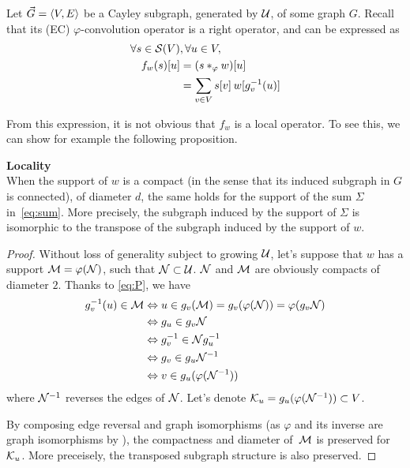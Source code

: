 Let $\vgve$ be a Cayley subgraph, generated by $\cu$, of some graph $G$. Recall that its (EC) $\varphi$-convolution operator is a right operator, and can be expressed as
\begin{align}
\forall s \in \cs(V) &, \forall u \in V,\nonumber\\
f_w(s)[u] & = (s \ast_{\varphi} w) [u]\nonumber\\
          & = \displaystyle\sum_{v \in V} s[v] \h{2} w[g_v^{-1}(u)] \label{eq:sum}
\end{align}

From this expression, it is not obvious that $f_w$ is a local operator. To see this, we can show for example the following proposition.

\begin{proposition}\textbf{Locality}\\
When the support of $w$ is a compact (in the sense that its induced subgraph in $G$ is connected), of diameter $d$, the same holds for the support of the sum $\Sigma$ in~\eqref{eq:sum}. More precisely, the subgraph induced by the support of $\Sigma$ is isomorphic to the transpose of the subgraph induced by the support of $w$.
\end{proposition}

\begin{proof}
Without loss of generality subject to growing $\cu$, let's suppose that $w$ has a support $\cm = \varphi(\cn)$, such that $\cn \subset \cu$. $\cn$ and $\cm$ are obviously compacts of diameter $2$. Thanks to \eqref{eq:P}, we have 
\begin{align*}
g_v^{-1}(u) \in \cm & \Leftrightarrow u \in g_v(\cm) = g_v(\varphi(\cn)) = \varphi(g_v\cn)\\
& \Leftrightarrow g_u \in g_v\cn\\
& \Leftrightarrow g_v^{-1} \in \cn g_u^{-1}\\
& \Leftrightarrow g_v \in g_u \cn^{-1}\\
& \Leftrightarrow v \in g_u(\varphi(\cn^{-1}))\\
\end{align*}
where $\cn^{-1}$ reverses the edges of $\cn$. Let's denote $\ck_u = g_u(\varphi(\cn^{-1})) \subset V$.

By composing edge reversal and graph isomorphisms (as $\varphi$ and its inverse are graph isomorphisms by ), the compactness and diameter of~$\cm$ is preserved for $\ck_u$. More preceisely, the transposed subgraph structure is also preserved.
\end{proof}

